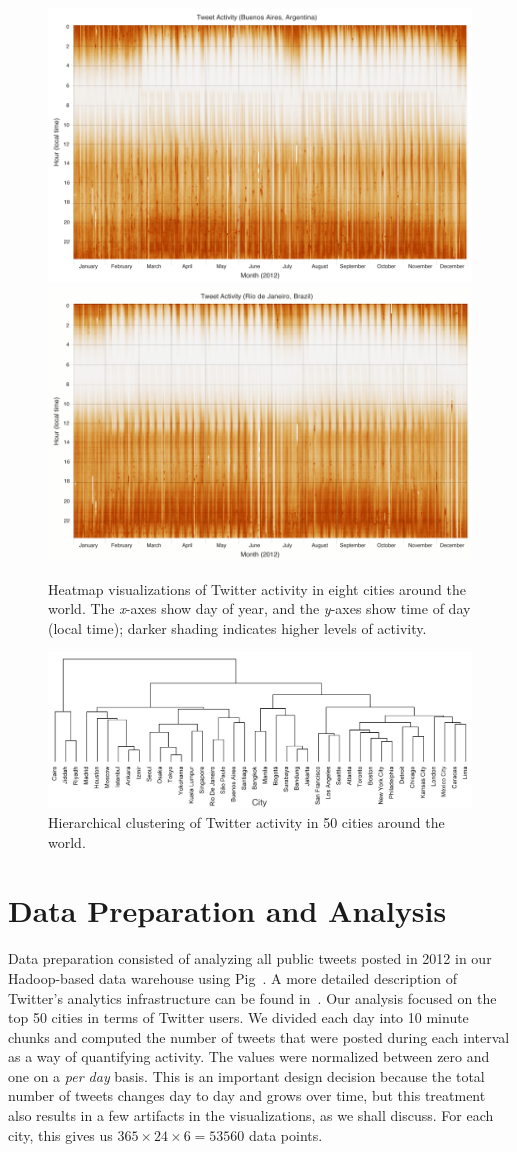 \documentclass[letterpaper]{article}
\begin{document}
\begin{figure}[p]
\includegraphics[width=0.45\linewidth]{heatmap_imgs/buenosaires.png}
\includegraphics[width=0.45\linewidth]{heatmap_imgs/rio.png}
\caption{Heatmap visualizations of Twitter activity in eight cities around the world. The
  {\it x}-axes show day of year, and the {\it y}-axes show time of day (local time);
  darker shading indicates higher levels of activity.}
\label{viz:cities}
\end{figure}

\begin{figure}[t]
\centering
\includegraphics[width=0.95\linewidth]{dendrograms/dendogram_50_bottom_clean_shorter.pdf}
\caption{Hierarchical clustering of Twitter activity in 50 cities around the world.}
\label{viz:dendrogram}
\end{figure}

\section{Data Preparation and Analysis}

Data preparation consisted of analyzing all public tweets posted in
2012 in our Hadoop-based data warehouse using Pig~\cite{Olston_etal_SIGMOD2008}. A more
detailed description of Twitter's analytics infrastructure can be found
in~\cite{Lin_Kolcz_SIGMOD2012}. Our analysis focused on the top 50
cities in terms of Twitter users. We divided each day into 10 minute
chunks and computed the number of tweets that were posted during each
interval as a way of quantifying activity. The values were normalized
between zero and one on a {\it per day} basis. This is an important
design decision because the total number of tweets changes day to day
and grows over time, but this treatment also results in a few
artifacts in the visualizations, as we shall discuss. For each city,
this gives us $365 \times 24 \times 6 = 53560$ data points.
\end{document}
